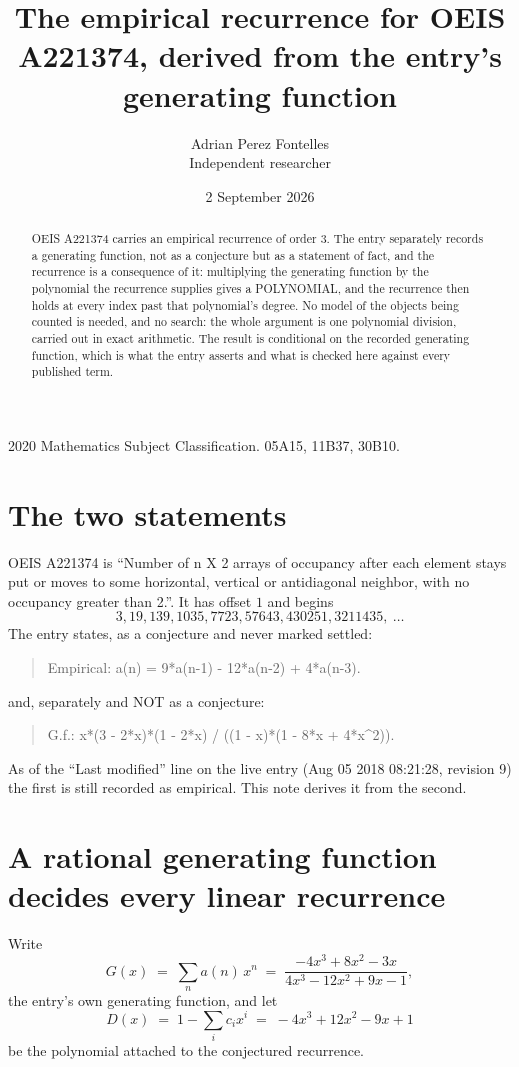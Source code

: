 \documentclass[11pt,a4paper]{article}
\title{The empirical recurrence for OEIS A221374, derived from the entry's generating function}
\author{Adrian Perez Fontelles\\ \small Independent researcher}
\date{2 September 2026}
\theoremstyle{plain}
\theoremstyle{definition}
\begin{document}
\maketitle

\begin{abstract}
OEIS A221374 carries an empirical recurrence of order $3$. The entry separately records a
generating function, not as a conjecture but as a statement of fact, and the recurrence is a
consequence of it: multiplying the generating function by the polynomial the recurrence
supplies gives a POLYNOMIAL, and the recurrence then holds at every index past that
polynomial's degree. No model of the objects being counted is needed, and no search: the
whole argument is one polynomial division, carried out in exact arithmetic. The result is
conditional on the recorded generating function, which is what the entry asserts and what is
checked here against every published term.
\end{abstract}

\noindent\small 2020 Mathematics Subject Classification. 05A15, 11B37, 30B10.\normalsize

\section{The two statements}

OEIS A221374 is ``Number of n X 2 arrays of occupancy after each element stays put or moves to some horizontal, vertical or antidiagonal neighbor, with no occupancy greater than 2.''. It has offset $1$ and begins
\[
3, 19, 139, 1035, 7723, 57643, 430251, 3211435,\ \dots
\]
The entry states, as a conjecture and never marked settled:
\begin{quote}
Empirical: a(n) = 9*a(n-1) - 12*a(n-2) + 4*a(n-3).
\end{quote}
and, separately and NOT as a conjecture:
\begin{quote}
G.f.: x*(3 - 2*x)*(1 - 2*x) / ((1 - x)*(1 - 8*x + 4*x\^{}2)).
\end{quote}
As of the ``Last modified'' line on the live entry (Aug 05 2018 08:21:28, revision 9) the first is still
recorded as empirical. This note derives it from the second.

\section{A rational generating function decides every linear recurrence}

Write
\[
G(x)\;=\;\sum_{n}a(n)\,x^{n}\;=\;\frac{- 4 x^{3} + 8 x^{2} - 3 x}{4 x^{3} - 12 x^{2} + 9 x - 1},
\]
the entry's own generating function, and let
\[
D(x)\;=\;1-\sum_i c_i x^{i}\;=\;- 4 x^{3} + 12 x^{2} - 9 x + 1
\]
be the polynomial attached to the conjectured recurrence.
\end{document}
